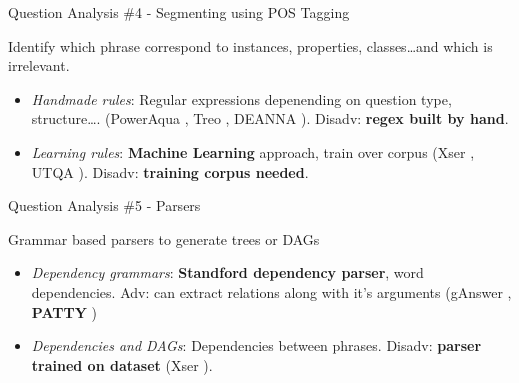 \documentclass{beamer}
\begin{document}

\begin{frame}{Question Analysis \#4 - Segmenting using POS Tagging}
  \begin{card}
    Identify which phrase correspond to instances, properties, classes\dots and which is irrelevant.
    \begin{itemize}
      \item \textit{Handmade rules}: Regular expressions depenending on question type, structure\dots. (PowerAqua \cite{lopez2012a}, Treo \cite{freitas2014a}, DEANNA \cite{yahya2013a}). Disadv: \textbf{regex built by hand}.
      \item \textit{Learning rules}: \textbf{Machine Learning} approach, train over corpus (Xser \cite{xu2014a}, UTQA \cite{pouran2016a}). Disadv: \textbf{training corpus needed}.
    \end{itemize}
  \end{card}
\end{frame}


\begin{frame}{Question Analysis \#5 - Parsers}
  \begin{card}
    Grammar based parsers to generate trees or DAGs
    \begin{itemize}
      \item \textit{Dependency grammars}: \textbf{Standford dependency parser}, word dependencies. Adv: can extract relations along with it's arguments (gAnswer \cite{zou2014a}, \textbf{PATTY} \cite{nakashole2012a})
      \item \textit{Dependencies and DAGs}: Dependencies between phrases. Disadv: \textbf{parser trained on dataset} (Xser \cite{xu2014a}).
    \end{itemize}
  \end{card}
\end{frame}

\end{document}
